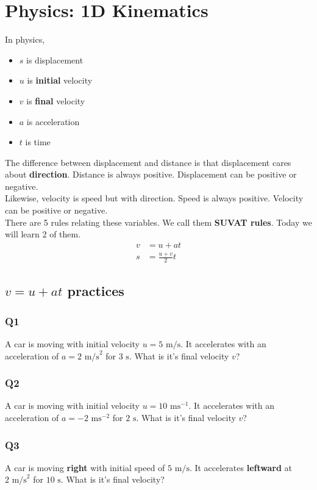 \documentclass{article}
\begin{document}
\section{Physics: 1D Kinematics}
In physics, 
\begin{itemize}
    \item $s$ is displacement 
    \item $u$ is \textbf{initial} velocity 
    \item $v$ is \textbf{final} velocity
    \item $a$ is acceleration
    \item $t$ is time
\end{itemize}
The difference between displacement and distance is that displacement cares about \textbf{direction}. Distance is always positive. Displacement can be positive or negative. \\[10pt]
Likewise, velocity is speed but with direction. Speed is always positive. Velocity can be positive or negative. \\[10pt]
There are 5 rules relating these variables. We call them \textbf{SUVAT rules}. Today we will learn 2 of them.
\begin{align}
    v &= u + at \\
    s &= \frac{u+v}{2} t 
\end{align}
\subsection{$v = u + at$ practices}
\subsubsection{Q1}
A car is moving with initial velocity $u=5 \text{ m/s}$. It accelerates with an acceleration of $a = 2\text{ m/s}^2$ for $3\text{ s}$. What is it's final velocity $v$? \\[50pt]
\subsubsection{Q2}
A car is moving with initial velocity $u=10 \text{ ms}^{-1}$. It accelerates with an acceleration of $a = -2\text{ ms}^{-2}$ for $2\text{ s}$. What is it's final velocity $v$? \\[50pt]
\subsubsection{Q3}
A car is moving \textbf{right} with initial speed of $5 \text{ m/s}$. It accelerates \textbf{leftward} at $2\text{ m/s}^2$ for $10\text{ s}$. What is it's final velocity? \\[50pt]
\end{document}
